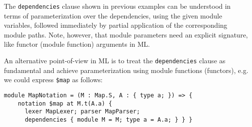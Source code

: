 \documentclass[acmsmall]{acmart}
\newcommand{\li}[1]{\lstinline[basicstyle=\ttfamily\fontsize{9pt}{1em}\selectfont]{#1}}
\begin{document}

The \li{dependencies} clause shown in previous examples can be understood in terms of parameterization over the dependencies, using the given module variables, followed immediately by partial application of the corresponding module paths. Note, however, that module parameters need an explicit signature, like functor (module function) arguments in ML.

An alternative point-of-view in ML is to treat the \li{dependencies} clause as fundamental and achieve parameterization using module functions (functors), e.g. we could express \li{$map} as follows:
\begin{lstlisting}[numbers=none]
  module MapNotation = (M : Map.S, A : { type a; }) => {
    notation $map at M.t(A.a) { 
      lexer MapLexer; parser MapParser; 
      dependencies { module M = M; type a = A.a; } } }
\end{lstlisting}




\end{document}

